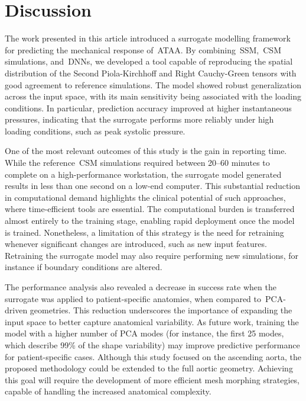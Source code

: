 \documentclass[a4paper,fleqn]{cas-sc}
\begin{document}
\section{Discussion} \label{sec:discussion}
The work presented in this article introduced a surrogate modelling framework for predicting the mechanical response of~\gls{ATAA}. By combining~\gls{SSM},~\gls{CSM} simulations, and~\glspl{DNN}, we developed a tool capable of reproducing the spatial distribution of the Second Piola-Kirchhoff and Right Cauchy-Green tensors with good agreement to reference simulations. The model showed robust generalization across the input space, with its main sensitivity being associated with the loading conditions. In particular, prediction accuracy improved at higher instantaneous pressures, indicating that the surrogate performs more reliably under high loading conditions, such as peak systolic pressure.

One of the most relevant outcomes of this study is the gain in reporting time. While the reference~\gls{CSM} simulations required between 20--60 minutes to complete on a high-performance workstation, the surrogate model generated results in less than one second on a low-end computer. This substantial reduction in computational demand highlights the clinical potential of such approaches, where time-efficient tools are essential. The computational burden is transferred almost entirely to the training stage, enabling rapid deployment once the model is trained. Nonetheless, a limitation of this strategy is the need for retraining whenever significant changes are introduced, such as new input features. Retraining the surrogate model may also require performing new simulations, for instance if boundary conditions are altered.

The performance analysis also revealed a decrease in success rate when the surrogate was applied to patient-specific anatomies, when compared to~\gls{PCA}-driven geometries. This reduction underscores the importance of expanding the input space to better capture anatomical variability. As future work, training the model with a higher number of PCA modes (for instance, the first 25 modes, which describe 99\% of the shape variability) may improve predictive performance for patient-specific cases. Although this study focused on the ascending aorta, the proposed methodology could be extended to the full aortic geometry. Achieving this goal will require the development of more efficient mesh morphing strategies, capable of handling the increased anatomical complexity.
\end{document}
